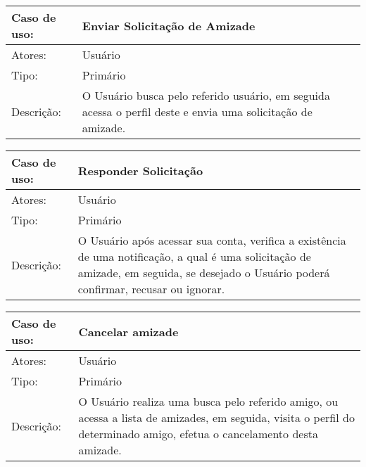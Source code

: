 \documentclass[12pt,a4paper,onecolumn,titlepage]{article}
\begin{document}
\begin{table}[h!]
\begin{center}
\begin{tabular}{p{2.5cm} p{9.5cm}}
Caso de uso: & \textbf{Enviar Solicitação de Amizade} \\ \hline
Atores: & Usuário \\ \hline
Tipo: & Primário \\ \hline
Descrição: & O Usuário busca pelo referido usuário, em seguida acessa o perfil deste e envia uma solicitação de amizade.

\end{tabular}
\end{center}
\end{table}

\clearpage

\begin{table}[h!]
\begin{center}
\begin{tabular}{p{2.5cm} p{9.5cm}}
Caso de uso: & \textbf{Responder Solicitação} \\ \hline
Atores: & Usuário \\ \hline
Tipo: & Primário \\ \hline
Descrição: & O Usuário após acessar sua conta, verifica a existência de uma notificação, a qual é uma solicitação de amizade, em seguida, se desejado o Usuário poderá confirmar, recusar ou ignorar.

\end{tabular}
\end{center}
\end{table}


\begin{table}[h!]
\begin{center}
\begin{tabular}{p{2.5cm} p{9.5cm}}
Caso de uso: & \textbf{Cancelar amizade} \\ \hline
Atores: & Usuário \\ \hline
Tipo: & Primário \\ \hline
Descrição: & O Usuário realiza uma busca pelo referido amigo, ou acessa a lista de amizades, em seguida, visita o perfil do determinado amigo, efetua o cancelamento desta amizade.

\end{tabular}
\end{center}
\end{table}
\end{document}

